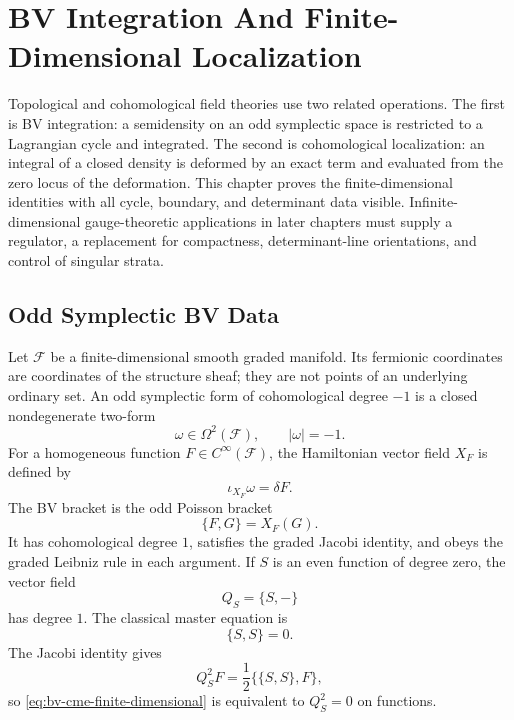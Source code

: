\chapter{BV Integration And Finite-Dimensional Localization}
\label{ch:tqft-bv-integration-localization}

\ConventionsEuclidean

Topological and cohomological field theories use two related operations.  The
first is BV integration: a semidensity on an odd symplectic space is restricted
to a Lagrangian cycle and integrated.  The second is cohomological
localization: an integral of a closed density is deformed by an exact term and
evaluated from the zero locus of the deformation.  This chapter proves the
finite-dimensional identities with all cycle, boundary, and determinant data
visible.  Infinite-dimensional gauge-theoretic applications in later chapters
must supply a regulator, a replacement for compactness, determinant-line
orientations, and control of singular strata.

\section{Odd Symplectic BV Data}

Let \(\mathcal F\) be a finite-dimensional smooth graded manifold.  Its
fermionic coordinates are coordinates of the structure sheaf; they are not
points of an underlying ordinary set.  An odd symplectic form of cohomological
degree \(-1\) is a closed nondegenerate two-form
\[
  \omega\in\Omega^2(\mathcal F),
  \qquad
  |\omega|=-1 .
\]
For a homogeneous function \(F\in C^\infty(\mathcal F)\), the Hamiltonian
vector field \(X_F\) is defined by
\[
  \iota_{X_F}\omega=\delta F .
\]
The BV bracket is the odd Poisson bracket
\[
  \{F,G\}=X_F(G).
\]
It has cohomological degree \(1\), satisfies the graded Jacobi identity, and
obeys the graded Leibniz rule in each argument.  If \(S\) is an even function
of degree zero, the vector field
\[
  Q_S=\{S,-\}
\]
has degree \(1\).  The classical master equation is
\begin{equation}
  \{S,S\}=0 .
  \label{eq:bv-cme-finite-dimensional}
\end{equation}
The Jacobi identity gives
\[
  Q_S^2F=\frac12\{\{S,S\},F\},
\]
so \eqref{eq:bv-cme-finite-dimensional} is equivalent to \(Q_S^2=0\) on
functions.

